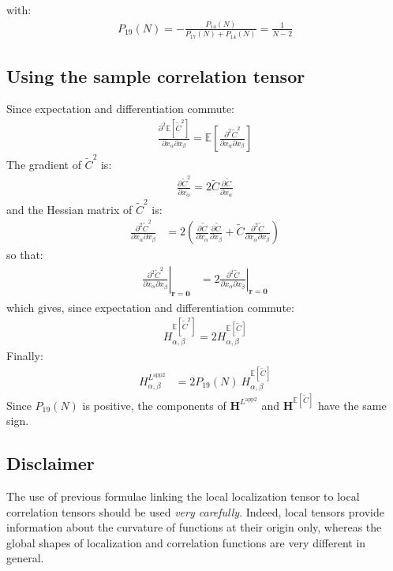 \documentclass[12pt]{scrartcl}
\begin{document}
with:
\begin{align}
P_{19}(N) = -\frac{P_{14}(N)}{P_{17}(N) + P_{14}(N)} = \frac{1}{N-2}
\end{align}

\subsection{Using the sample correlation tensor}
Since expectation and differentiation commute:
\begin{align}
\frac{\partial^2 \mathbb{E} \left[\widetilde{C}^2\right]}{\partial x_\alpha \partial x_\beta} = \mathbb{E} \left[ \frac{\partial^2 \widetilde{C}^2}{\partial x_\alpha \partial x_\beta} \right]
\end{align}
The gradient of $\widetilde{C}^2$ is:
\begin{align}
\frac{\partial \widetilde{C}^2}{\partial x_\alpha} = 2 \widetilde{C} \frac{\partial \widetilde{C}}{\partial x_\alpha}
\end{align}
and the Hessian matrix of $\widetilde{C}^2$ is:
\begin{align}
\frac{\partial^2 \widetilde{C}^2}{\partial x_\alpha \partial x_\beta} & = 2 \left(\frac{\partial \widetilde{C}}{\partial x_\alpha} \frac{\partial \widetilde{C}}{\partial x_\beta} + \widetilde{C} \frac{\partial^2 \widetilde{C}}{\partial x_\alpha \partial x_\beta} \right)
\end{align}
so that:
\begin{align}
\left.\frac{\partial^2 \widetilde{C}^2}{\partial x_\alpha \partial x_\beta} \right|_{\mathbf{r}=\mathbf{0}} & = 2 \left.\frac{\partial^2 \widetilde{C}}{\partial x_\alpha \partial x_\beta} \right|_{\mathbf{r}=\mathbf{0}}
\end{align}
which gives, since expectation and differentiation commute:
\begin{align}
H^{\mathbb{E} \left[ \widetilde{C}^2 \right]}_{\alpha,\beta} = 2 H^{\mathbb{E} \left[ \widetilde{C} \right]}_{\alpha,\beta}
\end{align}
Finally:
\begin{align}
H^{L^\mathrm{app2}}_{\alpha,\beta} & = 2 P_{19}(N) \ H^{\mathbb{E} \left[ \widetilde{C} \right]}_{\alpha,\beta}
\end{align}
Since $P_{19}(N)$ is positive, the components of $\mathbf{H}^{L^\mathrm{app2}}$ and $\mathbf{H}^{\mathbb{E} \left[ \widetilde{C} \right]}$ have the same sign.

\subsection{Disclaimer}
The use of previous formulae linking the local localization tensor to local correlation tensors should be used \textit{very carefully}. Indeed, local tensors provide information about the curvature of functions at their origin only, whereas the global shapes of localization and correlation functions are very different in general.
\end{document}

